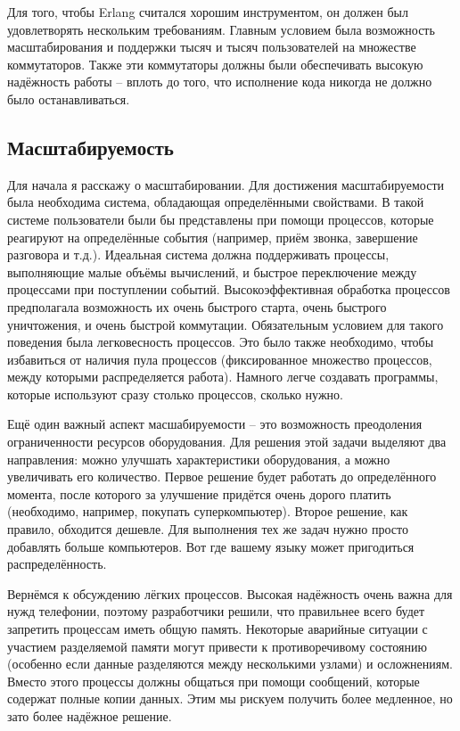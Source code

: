 Для того, чтобы Erlang считался хорошим инструментом, он должен был удовлетворять нескольким требованиям.
Главным условием была возможность масштабирования и поддержки тысяч и тысяч пользователей на множестве коммутаторов.
Также эти коммутаторы должны были обеспечивать высокую надёжность работы \--- вплоть до того, что исполнение кода никогда не должно было останавливаться.

\subsection{Масштабируемость}
\label{scalability}
Для начала я расскажу о масштабировании.
Для достижения масштабируемости была необходима система, обладающая определёнными свойствами.
В такой системе пользователи были бы представлены при помощи процессов, которые реагируют на определённые события (например, приём звонка, завершение разговора и т.д.).
Идеальная система должна поддерживать процессы, выполняющие малые объёмы вычислений, и быстрое переключение между процессами при поступлении событий. 
Высокоэффективная обработка процессов предполагала возможность их очень быстрого старта, очень быстрого уничтожения, и очень быстрой коммутации.
Обязательным условием для такого поведения была легковесность процессов.
Это было также необходимо, чтобы избавиться от наличия пула процессов (фиксированное множество процессов, между которыми распределяется работа).
Намного легче создавать программы, которые используют сразу столько процессов, сколько нужно.

Ещё один важный аспект масшабируемости \--- это возможность преодоления ограниченности ресурсов оборудования.
Для решения этой задачи выделяют два направления: можно улучшать характеристики оборудования, а можно увеличивать его количество.
Первое решение будет работать до определённого момента, после которого за улучшение придётся очень дорого платить (необходимо, например, покупать суперкомпьютер).
Второе решение, как правило, обходится дешевле.
Для выполнения тех же задач нужно просто добавлять больше компьютеров.
Вот где вашему языку может пригодиться распределённость.

Вернёмся к обсуждению лёгких процессов.
Высокая надёжность очень важна для нужд телефонии, поэтому разработчики решили, что правильнее всего будет запретить процессам иметь общую память.
Некоторые аварийные ситуации с участием разделяемой памяти могут привести к противоречивому состоянию (особенно если данные разделяются между несколькими узлами) и осложнениям.
Вместо этого процессы должны общаться при помощи сообщений, которые содержат полные копии данных.
Этим мы рискуем получить более медленное, но зато более надёжное решение.
